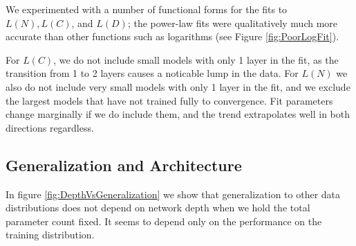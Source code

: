 \documentclass[english]{article}
\begin{document}
We experimented with a number of functional forms for the fits to $L(N), L(C)$, and $L(D)$; the power-law fits were qualitatively much more accurate than other functions such as logarithms (see Figure \ref{fig:PoorLogFit}).

For $L(C)$, we do not include small models with only 1 layer in the fit, as the transition from 1 to 2 layers causes a noticable lump in the data. For $L(N)$ we also do not include very small models with only 1 layer in the fit, and we exclude the largest models that have not trained fully to convergence.  Fit parameters change marginally if we do include them, and the trend extrapolates well in both directions regardless.



\subsection{Generalization and Architecture}
\label{sec:DepthVsGeneralization}

In figure \ref{fig:DepthVsGeneralization} we show that generalization to other data distributions does not depend on network depth when we hold the total parameter count fixed.  It seems to depend only on the performance on the training distribution.

\listoffigures
\listoftables



\end{document}

